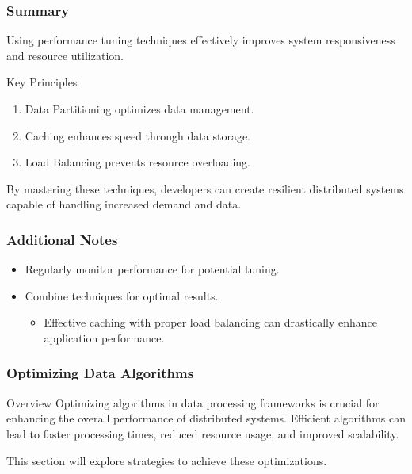\documentclass{beamer}
\begin{document}
\begin{frame}[fragile]
    \frametitle{Summary}
    Using performance tuning techniques effectively improves system responsiveness and resource utilization.

    \begin{block}{Key Principles}
        \begin{enumerate}
            \item Data Partitioning optimizes data management.
            \item Caching enhances speed through data storage.
            \item Load Balancing prevents resource overloading.
        \end{enumerate}
    \end{block}

    By mastering these techniques, developers can create resilient distributed systems capable of handling increased demand and data.
\end{frame}

\begin{frame}[fragile]
    \frametitle{Additional Notes}
    \begin{itemize}
        \item Regularly monitor performance for potential tuning.
        \item Combine techniques for optimal results.
        \begin{itemize}
            \item Effective caching with proper load balancing can drastically enhance application performance.
        \end{itemize}
    \end{itemize}
\end{frame}

\begin{frame}[fragile]
    \frametitle{Optimizing Data Algorithms}
    \begin{block}{Overview}
        Optimizing algorithms in data processing frameworks is crucial for enhancing the overall performance of distributed systems. Efficient algorithms can lead to faster processing times, reduced resource usage, and improved scalability.
    \end{block}
    This section will explore strategies to achieve these optimizations.
\end{frame}
\end{document}
